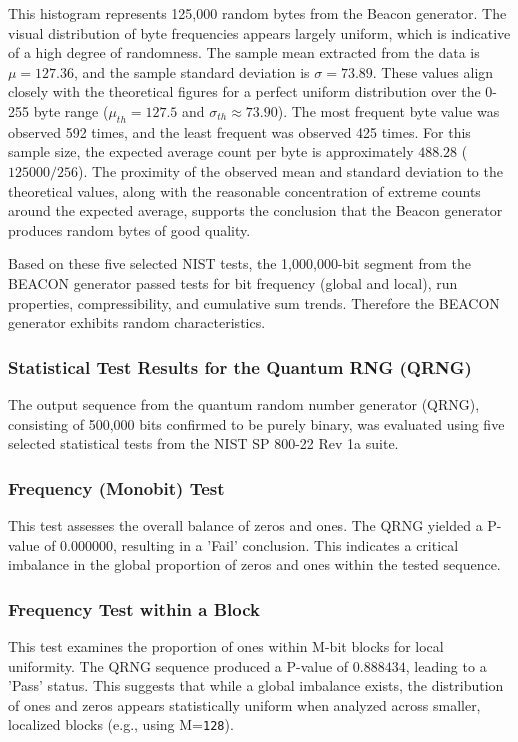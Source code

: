 This histogram represents 125,000 random bytes from the Beacon generator. The visual distribution of byte frequencies appears largely uniform, which is indicative of a high degree of randomness. The sample mean extracted from the data is $\mu = 127.36$, and the sample standard deviation is $\sigma = 73.89$. These values align closely with the theoretical figures for a perfect uniform distribution over the 0-255 byte range ($\mu_{th} = 127.5$ and $\sigma_{th} \approx 73.90$). The most frequent byte value was observed 592 times, and the least frequent was observed 425 times. For this sample size, the expected average count per byte is approximately $488.28$ ($125000 / 256$). The proximity of the observed mean and standard deviation to the theoretical values, along with the reasonable concentration of extreme counts around the expected average, supports the conclusion that the Beacon generator produces random bytes of good quality.

\noindent 

Based on these five selected NIST tests, the 1,000,000-bit segment from the BEACON generator passed tests for bit frequency (global and local), run properties, compressibility, and cumulative sum trends. Therefore the BEACON generator exhibits random characteristics.

\subsubsection{Statistical Test Results for the Quantum RNG (QRNG)}

The output sequence from the quantum random number generator (QRNG), consisting of 500,000 bits confirmed to be purely binary, was evaluated using five selected statistical tests from the NIST SP 800-22 Rev 1a suite.

\subsubsection{\textbf{Frequency (Monobit) Test}}
This test assesses the overall balance of zeros and ones. The QRNG yielded a P-value of $0.000000$, resulting in a 'Fail' conclusion. This indicates a critical imbalance in the global proportion of zeros and ones within the tested sequence.

\subsubsection{\textbf{Frequency Test within a Block}}
This test examines the proportion of ones within M-bit blocks for local uniformity. The QRNG sequence produced a P-value of $0.888434$, leading to a 'Pass' status. This suggests that while a global imbalance exists, the distribution of ones and zeros appears statistically uniform when analyzed across smaller, localized blocks (e.g., using M=\texttt{128}).


